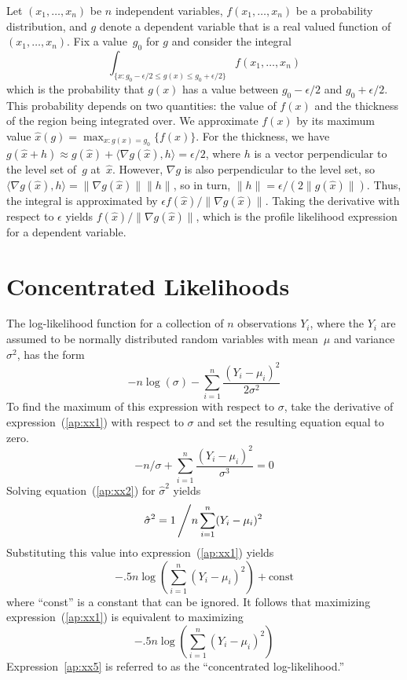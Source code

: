\documentclass{admbmanual}
\begin{document}
Let $(x_1,\ldots,x_n)$ be $n$ independent variables, $f(x_1,\ldots,x_n)$
be a probability distribution, and
$g$ denote a dependent variable that is a real valued function of 
$(x_1,\ldots,x_n)$.
Fix a value~$g_0$ for $g$ and consider the integral
$$\int_{\{x:g_0-\epsilon/2\le g(x)\le g_0+\epsilon/2\}} f(x_1,\ldots, x_n)$$
which is the probability that $g(x)$ has a value between 
$g_0-\epsilon/2$ and $g_0+\epsilon/2$. This probability depends 
on two quantities:
the value of $f(x)$ and the thickness of the region being integrated over.
We approximate $f(x)$ by its maximum value 
$\hat x(g)=\max_{x:g(x)=g_0}\{f(x)\}$. For the thickness, we have
$g(\hat x+h)\approx g(\hat x)+\langle\nabla g(\hat x),h\rangle=\epsilon/2$, where
$h$ is a vector perpendicular to the level set of~$g$ at~$\hat x$.
However,
$\nabla g$ is also perpendicular to the level set, so 
$\langle\nabla g(\hat x),h\rangle=\|\nabla g(\hat x)\| \|h\|$, so in turn,
$ \|h\|=\epsilon/(2\|g(\hat x)\|)$. Thus, the integral is approximated by
 $\epsilon f(\hat x)/\|\nabla g(\hat x)\|$.  Taking the derivative
with respect to $\epsilon$ yields 
$f(\hat x)/\|\nabla g(\hat x)\|$, which is the profile likelihood expression
for a dependent variable.


\chapter{Concentrated Likelihoods}

The log-likelihood function for a collection of $n$ observations $Y_i$,
where the $Y_i$ are assumed to be normally distributed random variables with
mean~$\mu$ and variance~$\sigma^2$, has the  form
\begin{equation}
  -n\log(\sigma)-\sum_{i=1}^n \frac{(Y_i-\mu_i)^2}{2\sigma^2}
\label{ap:xx1}
\end{equation}
To find the maximum of this expression with respect to $\sigma$, take the derivative
of expression~(\ref{ap:xx1}) with respect to $\sigma$ and set the resulting equation equal to zero.
\begin{equation}
  {-n/\sigma+\sum_{i=1}^n \frac{(Y_i-\mu_i)^2}{\sigma^3}=0}\label{ap:xx2}
\end{equation}
Solving equation~(\ref{ap:xx2}) for $\hat\sigma^2$ yields
\begin{equation}
  {\hat\sigma^2=1 \left/  n\sum_{i=1}^n (Y_i-\mu_i)^2 \right.}
\label{ap:xx3}
\end{equation}
Substituting this value into expression~(\ref{ap:xx1}) yields
\begin{equation}
  {-.5n\log \left( \sum_{i=1}^n (Y_i-\mu_i)^2 \right) +\textrm{const}}\label{ap:xx4}
\end{equation}
where ``\textrm{const}'' is a constant that can be ignored.
It follows that maximizing expression~(\ref{ap:xx1}) is equivalent to maximizing
\begin{equation}
  {-.5n\log \left( \sum_{i=1}^n (Y_i-\mu_i)^2 \right)}\label{ap:xx5}
\end{equation}
Expression~\ref{ap:xx5} is referred to as the ``concentrated log-likelihood.''
\end{document}
